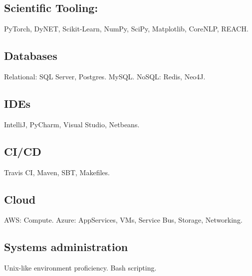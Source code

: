 \documentclass[letterpaper]{article}
\renewenvironment{itemize}{
  \begin{list}{}{
    \setlength{\leftmargin}{1.5em}
  }
}{
  \end{list}
}
\begin{document}
\subsection*{Scientific Tooling:}
\begin{itemize}
	\item PyTorch, DyNET, Scikit-Learn, NumPy, SciPy, Matplotlib, CoreNLP, REACH.
\end{itemize}
\vspace{-2em}
\subsection*{Databases}
\begin{itemize}
	\item Relational: SQL Server, Postgres. MySQL. NoSQL: Redis, Neo4J.
\end{itemize}
\vspace{-2em}
\subsection*{IDEs}
\begin{itemize}
	\item IntelliJ, PyCharm, Visual Studio, Netbeans.
\end{itemize}
\vspace{-2em}
\subsection*{CI/CD}
\begin{itemize}
	\item Travis CI, Maven, SBT, Makefiles.
\end{itemize}
\vspace{-2em}
\subsection*{Cloud}
\begin{itemize}
	\item AWS: Compute. Azure: AppServices, VMs, Service Bus, Storage, Networking.
\end{itemize}
\vspace{-2em}
\subsection*{Systems administration}
\begin{itemize}
	\item Unix-like environment proficiency. Bash scripting.
\end{itemize}
\end{document}
